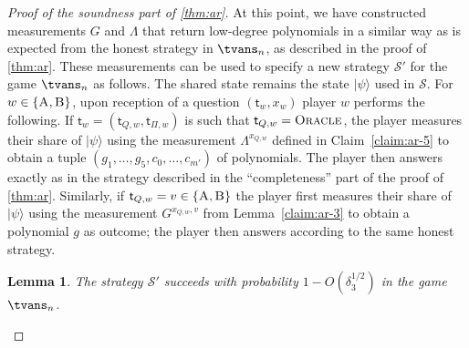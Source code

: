 \documentclass[11pt]{article}
\newtheorem{lemma}[theorem]{Lemma}
\theoremstyle{definition}
\newcommand{\ket}[1]{|#1\rangle}
\newcommand{\strategy}{\mathscr{S}}
\newcommand{\labelstyle}[1]{\ensuremath{\textsc{#1}}\xspace}
\newcommand{\tvarstyle}[1]{\mathsf{#1}}
\newcommand{\tvar}{\ensuremath{\tvarstyle{t}}}
\newcommand{\alice}{\labelstyle{A}}
\newcommand{\bob}{\labelstyle{B}}
\newcommand{\oracle}{\labelstyle{Oracle}}
\begin{document}
\begin{proof}[Proof of the soundness part of \cref{thm:ar}]
At this point, we have constructed measurements $G$ and $\Lambda$ that return
low-degree polynomials in a similar way as is expected from the honest strategy
in $\tvans_n$, as described in the proof of \cref{thm:ar}.
These measurements can be used to specify a new strategy $\strategy'$ for the
game $\tvans_n$ as follows.
The shared state remains the state $\ket{\psi}$ used in $\strategy$.
For $w\in \{\alice,\bob\}$, upon reception of a question $(\tvar_w,x_w)$ player
$w$ performs the following.
If $\tvar_w = (\tvar_{Q,w},\tvar_{\Pi,w})$ is such that $\tvar_{Q,w} = \oracle$,
the player measures their share of $\ket{\psi}$ using the measurement
$\Lambda^{x_{Q,w}}$ defined in Claim~\ref{claim:ar-5} to obtain a tuple
$(g_1,\ldots,g_5,c_0,\ldots,c_{m'})$ of polynomials.
The player then answers exactly as in the strategy described in the
``completeness'' part of the proof of \cref{thm:ar}.
Similarly, if $\tvar_{Q,w} = v \in \{\alice,\bob\}$ the player first measures
their share of $\ket{\psi}$ using the measurement $G^{x_{Q,w},v}$ from
Lemma~\ref{claim:ar-3} to obtain a polynomial $g$ as outcome; the player then
answers according to the same honest strategy.
	
\begin{lemma}\label{lem:ar-ar}
	The strategy $\strategy'$ succeeds with probability $1-O(\delta_3^{1/2})$ in the
  game $\tvans_n$.
\end{lemma}


\end{proof}
\end{document}
